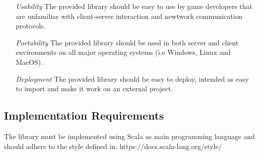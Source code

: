 \begin{itemize}
  \item[\emph{Usability}] The provided library should be easy to use by game developers that are unfamiliar with client-server interaction and newtwork communication protocols.
  \item[\em{Portability}] The provided library should be used in both server and client environments on all major operating systems (i.e Windows, Linux and MacOS).
  \item[\em{Deployment}] The provided library should be easy to deploy, intended as easy to import and make it work on an external project. 
\end{itemize}

\subsection{Implementation Requirements}
The library must be implemented using Scala as main programming language and should adhere to the style defined in: https://docs.scala-lang.org/style/
  
 
 

 